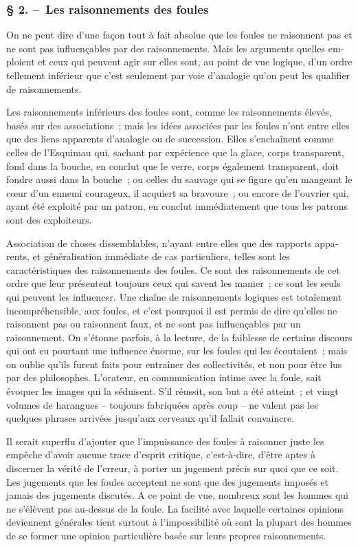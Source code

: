\documentclass[french,twoside]{book} %
\begin{document}
\subsubsection[{§ 2. – Les raisonnements des foules}]{§ 2. – Les raisonnements des foules}
\noindent On ne peut dire d’une façon tout à fait absolue que les foules ne raisonnent pas et ne sont pas influençables par des raisonnements. Mais les arguments quelles em­ploient et ceux qui peuvent agir sur elles sont, au point de vue logique, d’un ordre tellement inférieur que c’est seulement par voie d’analogie qu’on peut les qualifier de raisonnements.\par
Les raisonnements inférieurs des foules sont, comme les raisonnements élevés, basés sur des associations ; mais les idées associées par les foules n’ont entre elles que des liens apparents d’analogie ou de succession. Elles s’enchaînent comme celles de l’Esquimau qui, sa­chant par expérience que la glace, corps transparent, fond dans la bouche, en conclut que le verre, corps également transparent, doit fondre aussi dans la bouche ; ou celles du sauvage qui se figure qu’en mangeant le cœur d’un ennemi courageux, il acquiert sa bravoure ; ou encore de l’ouvrier qui, ayant été exploité par un patron, en conclut immédiatement que tous les patrons sont des exploiteurs.\par
Association de choses dissemblables, n’ayant entre elles que des rapports appa­rents, et généralisation immédiate de cas particuliers, telles sont les caractéristiques des raisonnements des foules. Ce sont des raisonnements de cet ordre que leur présentent toujours ceux qui savent les manier ; ce sont les seuls qui peuvent les influencer. Une chaîne de raisonnements logiques est totalement incompréhensible, aux foules, et c’est pourquoi il est permis de dire qu’elles ne raisonnent pas ou raison­nent faux, et ne sont pas influençables par un raisonnement. On s’étonne parfois, à la lecture, de la faiblesse de certains discours qui ont eu pourtant une influence énorme, sur les foules qui les écoutaient ; mais on oublie qu’ils furent faits pour entraîner des collectivités, et non pour être lus par des philosophes. L’orateur, en communication intime avec la foule, sait évoquer les images qui la séduisent. S’il réussit, son but a été atteint ; et vingt volumes de harangues – toujours fabriquées après coup – ne valent pas les quelques phrases arrivées jusqu’aux cerveaux qu’il fallait convaincre.\par
Il serait superflu d’ajouter que l’impuissance des foules à raisonner juste les empê­che d’avoir aucune trace d’esprit critique, c’est-à-dire, d’être aptes à discerner la vérité de l’erreur, à porter un jugement précis sur quoi que ce soit. Les jugements que les foules acceptent ne sont que des jugements imposés et jamais des jugements discutés. A ce point de vue, nombreux sont les hommes qui ne s’élèvent pas au-dessus de la foule. La facilité avec laquelle certaines opinions deviennent générales tient surtout à l’impossibilité où sont la plupart des hommes de se former une opinion particulière basée sur leurs propres raisonnements.
\end{document}
